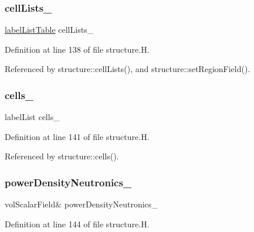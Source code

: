 \subsubsection{\texorpdfstring{cell\+Lists\+\_\+}{cellLists\_}}
{\footnotesize\ttfamily \hyperlink{classFoam_1_1structure_afefd20eeb8d2675bfba9c1ce9aa78ca7}{label\+List\+Table} cell\+Lists\+\_\+\hspace{0.3cm}{\ttfamily [protected]}}



Definition at line 138 of file structure.\+H.



Referenced by structure\+::cell\+Lists(), and structure\+::set\+Region\+Field().

\mbox{\label{classFoam_1_1structure_a668e23f1aa896d53b68f6182e48f32d9}} 
\subsubsection{\texorpdfstring{cells\+\_\+}{cells\_}}
{\footnotesize\ttfamily label\+List cells\+\_\+\hspace{0.3cm}{\ttfamily [protected]}}



Definition at line 141 of file structure.\+H.



Referenced by structure\+::cells().

\mbox{\label{classFoam_1_1structure_a70eafb5d670fefbe4115321567671063}} 
\subsubsection{\texorpdfstring{power\+Density\+Neutronics\+\_\+}{powerDensityNeutronics\_}}
{\footnotesize\ttfamily vol\+Scalar\+Field\& power\+Density\+Neutronics\+\_\+\hspace{0.3cm}{\ttfamily [protected]}}



Definition at line 144 of file structure.\+H.



